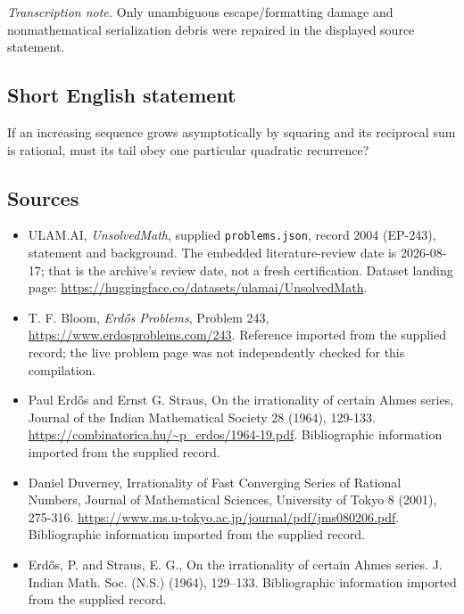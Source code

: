 \documentclass[11pt,a4paper]{article}
\begin{document}
{\small\emph{Transcription note.} Only unambiguous escape/formatting damage and nonmathematical serialization debris were repaired in the displayed source statement.}

\subsection{Short English statement}

If an increasing sequence grows asymptotically by squaring and its reciprocal sum is rational, must its tail obey one particular quadratic recurrence?

\subsection{Sources}

{\small

\begin{itemize}

\item[\hypertarget{source:2004:1}{S1}] ULAM.AI, \emph{UnsolvedMath}, supplied \texttt{problems.json}, record 2004 (EP-243), statement and background. The embedded literature-review date is 2026-08-17; that is the archive’s review date, not a fresh certification. Dataset landing page: \url{https://huggingface.co/datasets/ulamai/UnsolvedMath}.

\item[\hypertarget{source:2004:2}{S2}] T. F. Bloom, \emph{Erdős Problems}, Problem 243, \url{https://www.erdosproblems.com/243}. Reference imported from the supplied record; the live problem page was not independently checked for this compilation.

\item[\hypertarget{source:2004:3}{S3}] Paul Erdős and Ernst G. Straus, On the irrationality of certain Ahmes series, Journal of the Indian Mathematical Society 28 (1964), 129-133. \url{https://combinatorica.hu/~p_erdos/1964-19.pdf}. Bibliographic information imported from the supplied record.

\item[\hypertarget{source:2004:4}{S4}] Daniel Duverney, Irrationality of Fast Converging Series of Rational Numbers, Journal of Mathematical Sciences, University of Tokyo 8 (2001), 275-316. \url{https://www.ms.u-tokyo.ac.jp/journal/pdf/jms080206.pdf}. Bibliographic information imported from the supplied record.

\item[\hypertarget{source:2004:5}{S5}] Erd\H{o}s, P. and Straus, E. G., On the irrationality of certain {A}hmes series. J. Indian Math. Soc. (N.S.) (1964), 129--133. Bibliographic information imported from the supplied record.

\end{itemize}

}

\label{end:2004}
\end{document}
